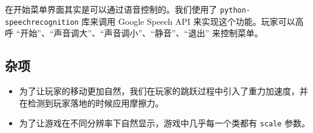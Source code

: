 \documentclass[12pt, twoside, a4paper]{article}
\newcommand{\inlinecode}[1]{\setlength{\fboxsep}{0.8mm} \colorbox{lightgray!40}{\texttt{#1}}}
\begin{document}
在开始菜单界面其实是可以通过语音控制的。我们使用了 \inlinecode{python-speechrecognition} 库来调用 Google Speech API 来实现这个功能。玩家可以高呼 “开始”、“声音调大”、“声音调小”、“静音”、“退出” 来控制菜单。

\subsection{杂项}

\begin{itemize}
    \item 为了让玩家的移动更加自然，我们在玩家的跳跃过程中引入了重力加速度，并在检测到玩家落地的时候应用摩擦力。
    \item 为了让游戏在不同分辨率下自然显示，游戏中几乎每一个类都有 \inlinecode{scale} 参数。
\end{itemize}
\end{document}
